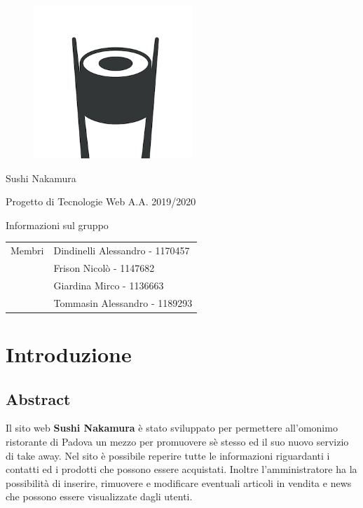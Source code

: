 \documentclass{article}
\begin{document}
	\begin{titlepage}
		\begin{figure}[http]
			\centering
			\includegraphics[width=6cm]{logo.jpg}
		\end{figure}
	
		\vspace*{2cm}
		
		{\huge\bfseries\centerline{Sushi Nakamura} }
		\centerline{Progetto di Tecnologie Web A.A. 2019/2020}
		
		\vspace*{1cm}
		{\bfseries \centerline{Informazioni sul gruppo}}
		\begin{center}
			\begin{tabular}{ c|l } 
				Membri & Dindinelli Alessandro - 1170457\\ 
				& Frison Nicolò - 1147682\\ 
				& Giardina Mirco - 1136663\\
				& Tommasin Alessandro - 1189293\\ 
			\end{tabular}
		\end{center}
		
		\vspace*{\fill}
		
	\end{titlepage}
	
	\clearpage
	\renewcommand*\contentsname{Indice}
	\tableofcontents	
	\newpage
	
	\section{Introduzione}
		\subsection{Abstract}
			Il sito web \textbf{Sushi Nakamura} è stato sviluppato per permettere all'omonimo ristorante di Padova un mezzo per promuovere sè stesso ed il suo nuovo servizio di take away.
			Nel sito è possibile reperire tutte le informazioni riguardanti i contatti ed i prodotti che possono essere acquistati.
			Inoltre l'amministratore ha la possibilità di inserire, rimuovere e modificare eventuali articoli in vendita e news che possono essere visualizzate dagli utenti.
\end{document}
